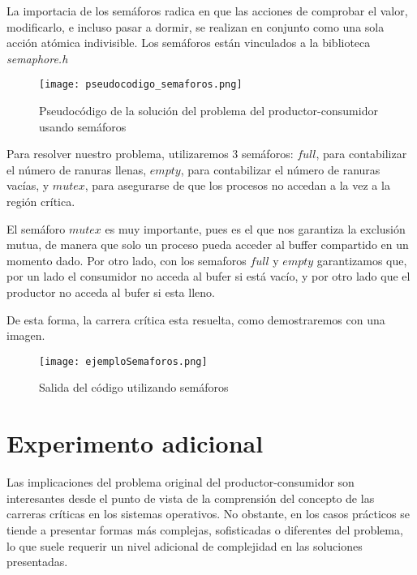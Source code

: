\documentclass[a4paper,twocolumn]{article}
\begin{document}
    La importacia de los semáforos radica en que las acciones de comprobar el valor, modificarlo, e incluso pasar a dormir, se realizan en conjunto como una sola acción atómica indivisible. 
    Los semáforos están vinculados a la biblioteca \textit{semaphore.h}

    \begin{figure}[h]
    \centering
    \texttt{[image: pseudocodigo\_semaforos.png]}
    \caption{Pseudocódigo de la solución del problema del productor-consumidor usando semáforos}
    \label{fig:mi_imagen}
    \end{figure}

    Para resolver nuestro problema, utilizaremos 3 semáforos: $full$, para contabilizar el número de ranuras llenas, $empty$, para contabilizar el número de ranuras vacías, y $mutex$, para asegurarse de que los procesos no accedan a la vez a la región crítica.

    El semáforo $mutex$ es muy importante, pues es el que nos garantiza la exclusión mutua, de manera que solo un proceso pueda acceder al buffer compartido en un momento dado. Por otro lado, con los semaforos $full$ y $empty$ garantizamos que, por un lado el consumidor no acceda al bufer si está vacío, y por otro lado que el productor no acceda al bufer si esta lleno.

    De esta forma, la carrera crítica esta resuelta, como demostraremos con una imagen.


    \begin{figure}[h]
    \centering
    \texttt{[image: ejemploSemaforos.png]}
    \caption{Salida del código utilizando semáforos}
    \label{fig:mi_imagen}
    \end{figure}


      \section{Experimento adicional}

    Las implicaciones del problema original del productor-consumidor son interesantes desde el punto de vista de la comprensión del concepto de las carreras críticas en los sistemas operativos. No obstante, en los casos prácticos se tiende a presentar formas más complejas, sofisticadas o diferentes del problema, lo que suele requerir un nivel adicional de complejidad en las soluciones presentadas.

	
\end{document}
